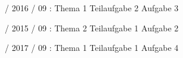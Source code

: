 \documentclass{lehramt-informatik-haupt}
\begin{document}
%

 / 2016 / 09 : Thema 1 Teilaufgabe 2 Aufgabe 3

%

 / 2015 / 09 : Thema 2 Teilaufgabe 1 Aufgabe 2

%

 / 2017 / 09 : Thema 1 Teilaufgabe 1 Aufgabe 4

\literatur
\end{document}
